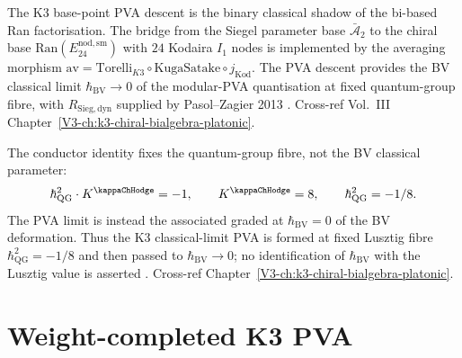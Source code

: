 \begin{remark}
\label{rem:pvadr-1}
The K3 base-point PVA descent is the binary classical shadow of the
bi-based Ran factorisation. The bridge from the Siegel parameter base
$\bar{\mathcal A}_2$ to the chiral base
$\mathrm{Ran}(E^{\mathrm{nod,sm}}_{24})$ with $24$ Kodaira $I_1$
nodes is implemented by the averaging morphism
$\mathrm{av} = \mathrm{Torelli}_{K3}\circ\mathrm{KugaSatake}\circ j_{\mathrm{Kod}}$.
The PVA descent provides the BV classical limit
$\hbar_{\mathrm{BV}}\to 0$ of the modular-PVA quantisation at fixed
quantum-group fibre, with $R_{\mathrm{Sieg,dyn}}$ supplied by
Pasol--Zagier 2013
\cite{KugaSatake1967,PasolZagier2013}. Cross-ref Vol.~III
Chapter~\ref{V3-ch:k3-chiral-bialgebra-platonic}.
\end{remark}

\begin{remark}
\label{rem:pvadr-2}
The conductor identity fixes the quantum-group fibre, not the BV
classical parameter:
\[
\hbar_{\mathrm{QG}}^2\cdot K^{\kappaChHodge}=-1,\qquad
K^{\kappaChHodge}=8,\qquad
\hbar_{\mathrm{QG}}^2=-1/8.
\]
The PVA limit is instead the associated graded at
$\hbar_{\mathrm{BV}}=0$ of the BV deformation. Thus the K3
classical-limit PVA is formed at fixed Lusztig fibre
$\hbar_{\mathrm{QG}}^2=-1/8$ and then passed to
$\hbar_{\mathrm{BV}}\to0$; no identification of
$\hbar_{\mathrm{BV}}$ with the Lusztig value is asserted
\cite{Lusztig1990}.
Cross-ref Chapter~\ref{V3-ch:k3-chiral-bialgebra-platonic}.
\end{remark}

\section{Weight-completed K3 PVA}
\label{sec:pvadr-supplement-ii}

